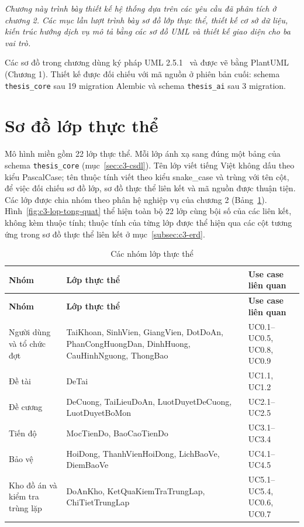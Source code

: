\documentclass[../main.tex]{subfiles}
\begin{document}
\textit{Chương này trình bày thiết kế hệ thống dựa trên các yêu cầu đã phân tích ở chương 2. Các mục lần lượt trình bày sơ đồ lớp thực thể, thiết kế cơ sở dữ liệu, kiến trúc hướng dịch vụ mô tả bằng các sơ đồ UML và thiết kế giao diện cho ba vai trò.}

Các sơ đồ trong chương dùng ký pháp UML 2.5.1~\cite{uml251} và được vẽ bằng PlantUML~\cite{plantuml} (Chương 1). Thiết kế được đối chiếu với mã nguồn ở phiên bản cuối: schema \texttt{thesis\_core} sau 19 migration Alembic và schema \texttt{thesis\_ai} sau 3 migration.

\section{Sơ đồ lớp thực thể}\label{sec:c3-lop}

Mô hình miền gồm 22 lớp thực thể. Mỗi lớp ánh xạ sang đúng một bảng của schema \texttt{thesis\_core} (mục~\ref{sec:c3-csdl}). Tên lớp viết tiếng Việt không dấu theo kiểu PascalCase; tên thuộc tính viết theo kiểu snake\_case và trùng với tên cột, để việc đối chiếu sơ đồ lớp, sơ đồ thực thể liên kết và mã nguồn được thuận tiện. Các lớp được chia nhóm theo phân hệ nghiệp vụ của chương 2 (Bảng~\ref{tab:c3-nhom-lop}). Hình~\ref{fig:c3-lop-tong-quat} thể hiện toàn bộ 22 lớp cùng bội số của các liên kết, không kèm thuộc tính; thuộc tính của từng lớp được thể hiện qua các cột tương ứng trong sơ đồ thực thể liên kết ở mục~\ref{subsec:c3-erd}.

{\renewcommand{\arraystretch}{1.2}
\begin{longtable}{|p{3.6cm}|p{6.9cm}|p{4.2cm}|}
\caption{Các nhóm lớp thực thể}\label{tab:c3-nhom-lop}\\
\hline
\textbf{Nhóm} & \textbf{Lớp thực thể} & \textbf{Use case liên quan} \\
\hline
\endfirsthead
\hline
\textbf{Nhóm} & \textbf{Lớp thực thể} & \textbf{Use case liên quan} \\
\hline
\endhead
Người dùng và tổ chức đợt & TaiKhoan, SinhVien, GiangVien, DotDoAn, PhanCongHuongDan, DinhHuong, CauHinhNguong, ThongBao & UC0.1--UC0.5, UC0.8, UC0.9 \\
\hline
Đề tài & DeTai & UC1.1, UC1.2 \\
\hline
Đề cương & DeCuong, TaiLieuDoAn, LuotDuyetDeCuong, LuotDuyetBoMon & UC2.1--UC2.5 \\
\hline
Tiến độ & MocTienDo, BaoCaoTienDo & UC3.1--UC3.4 \\
\hline
Bảo vệ & HoiDong, ThanhVienHoiDong, LichBaoVe, DiemBaoVe & UC4.1--UC4.5 \\
\hline
Kho đồ án và kiểm tra trùng lặp & DoAnKho, KetQuaKiemTraTrungLap, ChiTietTrungLap & UC5.1--UC5.4, UC0.6, UC0.7 \\
\hline
\end{longtable}
}
\end{document}
